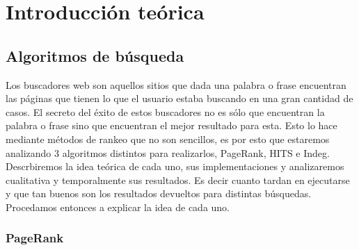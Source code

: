 \section{Introducci\'on te\'orica}

\subsection{Algoritmos de búsqueda}

Los buscadores web son aquellos sitios que dada una palabra o frase encuentran las páginas que tienen lo que el usuario estaba buscando en una gran cantidad de casos. El secreto del éxito de estos buscadores no es sólo que encuentran la palabra o frase sino que encuentran el mejor resultado para esta. Esto lo hace mediante métodos de rankeo que no son sencillos, es por esto que estaremos analizando 3 algoritmos distintos para realizarlos, PageRank, HITS e Indeg. Descrbiremos la idea teórica de cada uno, sus implementaciones y analizaremos cualitativa y temporalmente sus resultados. Es decir cuanto tardan en ejecutarse y que tan buenos son los resultados devueltos para distintas búsquedas. Procedamos entonces a explicar la idea de cada uno.

\subsubsection{PageRank}

